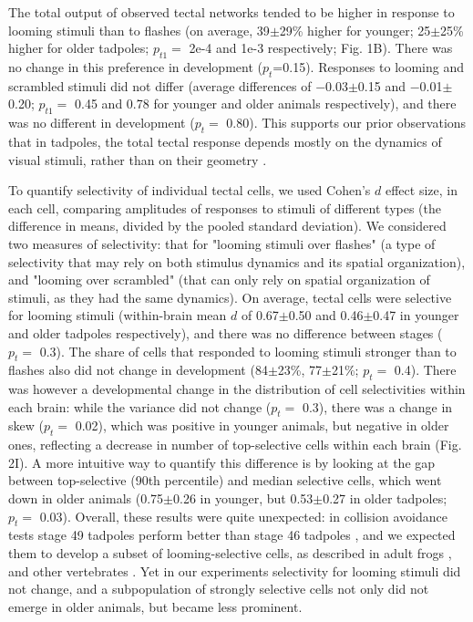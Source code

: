 \documentclass{article}
\begin{document}
The total output of observed tectal networks tended to be higher in response to looming stimuli than to flashes (on average, 39$\pm$29\% higher for younger; 25$\pm$25\% higher for older tadpoles; $p_{t1}=$ 2e-4 and 1e-3 respectively; Fig. 1B). There was no change in this preference in development ($p_t$=0.15). Responses to looming and scrambled stimuli did not differ (average differences of $-$0.03$\pm$0.15 and $-$0.01$\pm$0.20; $p_{t1}=$ 0.45 and 0.78 for younger and older animals respectively), and there was no different in development ($p_t=$ 0.80). This supports our prior observations that in tadpoles, the total tectal response depends mostly on the dynamics of visual stimuli, rather than on their geometry \citep{khakhalin2014,jang2016}.

To quantify selectivity of individual tectal cells, we used Cohen’s $d$ effect size, in each cell, comparing amplitudes of responses to stimuli of different types (the difference in means, divided by the pooled standard deviation). We considered two measures of selectivity: that for "looming stimuli over flashes" (a type of selectivity that may rely on both stimulus dynamics and its spatial organization), and "looming over scrambled" (that can only rely on spatial organization of stimuli, as they had the same dynamics). On average, tectal cells were selective for looming stimuli (within-brain mean $d$ of 0.67$\pm$0.50 and 0.46$\pm$0.47 in younger and older tadpoles respectively), and there was no difference between stages ($p_t=$ 0.3). The share of cells that responded to looming stimuli stronger than to flashes also did not change in development (84$\pm$23\%, 77$\pm$21\%; $p_t=$ 0.4). There was however a developmental change in the distribution of cell selectivities within each brain: while the variance did not change ($p_t=$ 0.3), there was a change in skew ($p_t=$ 0.02), which was positive in younger animals, but negative in older ones, reflecting a decrease in number of top-selective cells within each brain (Fig. 2I). A more intuitive way to quantify this difference is by looking at the gap between top-selective (90th percentile) and median selective cells, which went down in older animals (0.75$\pm$0.26 in younger, but 0.53$\pm$0.27 in older tadpoles; $p_t=$ 0.03). Overall, these results were quite unexpected: in collision avoidance tests stage 49 tadpoles perform better than stage 46 tadpoles \citep{dong2009}, and we expected them to develop a subset of looming-selective cells, as described in adult frogs \citep{nakagawa2010otneurons,baranauskas2012}, and other vertebrates \citep{wang1992pigeon,wu2005pigeon,liu2011cat}. Yet in our experiments selectivity for looming stimuli did not change, and a subpopulation of strongly selective cells not only did not emerge in older animals, but became less prominent.
\end{document}
